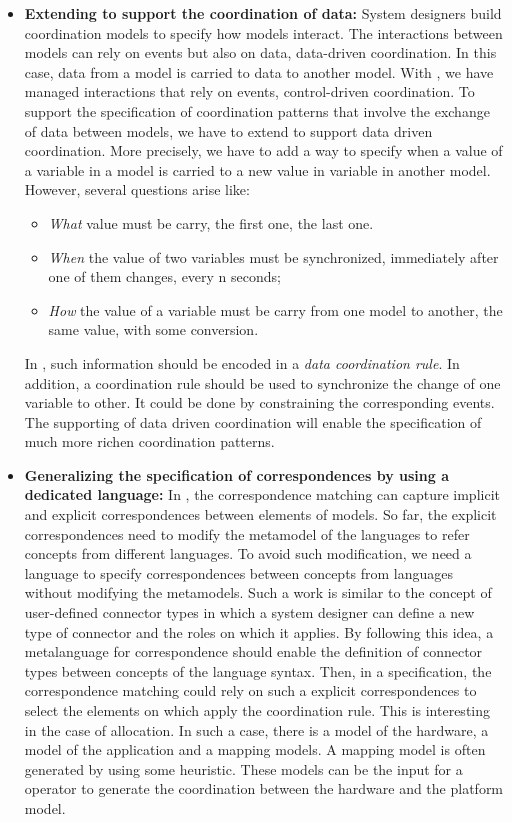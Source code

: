 \begin{itemize}
	\item \textbf{Extending \bcool to support the coordination of data:} System designers build coordination models to specify how models interact. The interactions between models can rely on events but also on data, \ie data-driven coordination. In this case, data from a model is carried to data to another model. With \bcool, we have managed interactions that rely on events, \ie control-driven coordination. To support the specification of coordination patterns that involve the exchange of data between models, we have to extend \bcool to support data driven coordination. More precisely, we have to add a way to specify when a value of a variable in a model is carried to a new value in variable in another model. However, several questions arise like:
			\begin{itemize}
				\item \emph{What} value must be carry, \eg the first one, the last one.
				\item \emph{When} the value of two variables must be synchronized, \eg immediately after one of them changes, every n seconds;
				\item \emph{How} the value of a variable must be carry from one model to another, \eg the same value, with some conversion. 
			\end{itemize}
	In \bcool, such information should be encoded in a \emph{data coordination rule}. In addition, a coordination rule should be used to synchronize the change of one variable to other. It could be done by constraining the corresponding events. The supporting of data driven coordination will enable the specification of much more richen coordination patterns. 	 
	\item \textbf{Generalizing the specification of correspondences by using a dedicated language:} In \bcool, the correspondence matching can capture implicit and explicit correspondences between elements of models. So far, the explicit correspondences need to modify the metamodel of the languages to refer concepts from different languages. To avoid such modification, we need a language to specify correspondences between concepts from languages without modifying the metamodels. Such a work is similar to the concept of user-defined connector types in which a system designer can define a new type of connector and the roles on which it applies. By following this idea, a metalanguage for correspondence should enable the definition of connector types between concepts of the language syntax. Then, in a \bcool specification, the correspondence matching could rely on such a explicit correspondences to select the elements on which apply the coordination rule. This is interesting in the case of allocation. In such a case, there is a model of the hardware, a model of the application and a mapping models. A mapping model is often generated by using some heuristic. These models can be the input for a \bcool operator to generate the coordination between the hardware and the platform model.  

\end{itemize}
